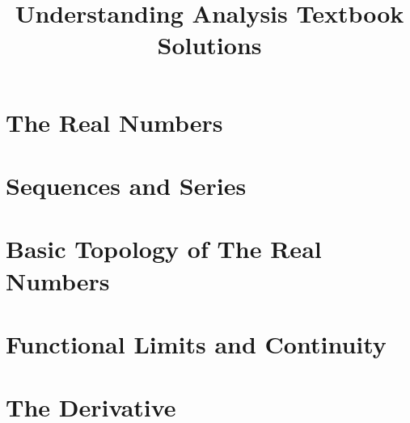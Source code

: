 \documentclass[a4paper]{book}
\title{Understanding Analysis Textbook Solutions}
\begin{document}
\maketitle
\tableofcontents

\chapter{The Real Numbers}







\chapter{Sequences and Series}














\chapter{Basic Topology of The Real Numbers}








\chapter{Functional Limits and Continuity}











\chapter{The Derivative}
\end{document}

